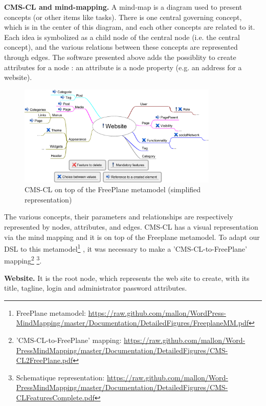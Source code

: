 				\vspace{0.15em}
				\noindent\textbf{CMS-CL and mind-mapping.} A mind-map is a diagram used to present concepts (or other items like tasks). There is one central governing concept, which is in the center of this 							diagram, and each other concepts are related to it. Each idea is symbolized as a child node of the central node (i.e. the central concept), and the 							various relations between these concepts are represented through edges. The software presented above adds the possiblity to create attributes for a 								node : an attribute is a node property (e.g. an address for a website).
									
						\begin{figure}[!h]
							\centering
							\includegraphics[width=0.85\textwidth]{../resources/pdf/CMS-CLFeatures.pdf}
							\caption{CMS-CL on top of the FreePlane metamodel (simplified representation)}
							\label{websiteDSLFeatures}
						\end{figure}
						The various concepts, their parameters and relationships are respectively represented by nodes, 
						attributes, and edges. CMS-CL has a visual representation via the mind mapping and it is on top of the Freeplane metamodel. 
						To adapt our DSL to this metamodel\footnote{\scriptsize{FreePlane metamodel: \url{https://raw.github.com/mallon/WordPress-MindMapping/master/Documentation/DetailedFigures/FreeplaneMM.pdf}}} 
						, it was necessary to make a 'CMS-CL-to-FreePlane' mapping\footnote{\scriptsize{'CMS-CL-to-FreePlane' mapping: \url{https://raw.github.com/mallon/Word-PressMindMapping/master/Documentation/DetailedFigures/CMS-CL2FreePlane.pdf}}} 
\footnote{\scriptsize{Schematique representation: \url{https://raw.github.com/mallon/Word-PressMindMapping/master/Documentation/DetailedFigures/CMS-CLFeaturesComplete.pdf}}}.
						
						\vspace{0.15em}
						\noindent\textbf{Website.} It is the root node, which represents the web site to create, with its title, tagline, 	
						login and administrator password attributes. 
						
